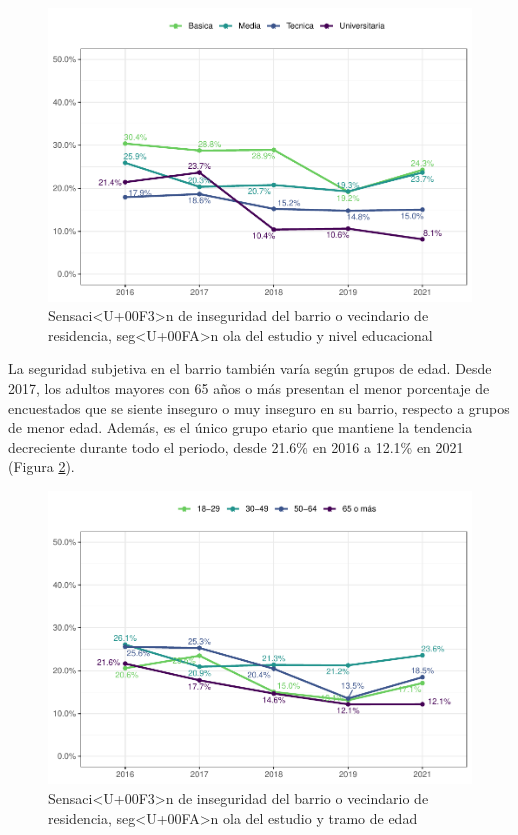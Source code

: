 \documentclass[
  12pt,
]{book}
\begin{document}
\begin{figure}

{\centering \includegraphics{reporte-elsoc_files/figure-latex/seguri-educ-1} 

}

\caption{Sensaci<U+00F3>n de inseguridad del barrio o vecindario de residencia, seg<U+00FA>n ola del estudio y nivel educacional}\label{fig:seguri-educ}
\end{figure}

La seguridad subjetiva en el barrio también varía según grupos de edad. Desde 2017, los adultos mayores con 65 años o más presentan el menor porcentaje de encuestados que se siente inseguro o muy inseguro en su barrio, respecto a grupos de menor edad. Además, es el único grupo etario que mantiene la tendencia decreciente durante todo el periodo, desde 21.6\% en 2016 a 12.1\% en 2021 (Figura \ref{fig:seguri-edad}).

\begin{figure}

{\centering \includegraphics{reporte-elsoc_files/figure-latex/seguri-edad-1} 

}

\caption{Sensaci<U+00F3>n de inseguridad del barrio o vecindario de residencia, seg<U+00FA>n ola del estudio y tramo de edad}\label{fig:seguri-edad}
\end{figure}
\end{document}
